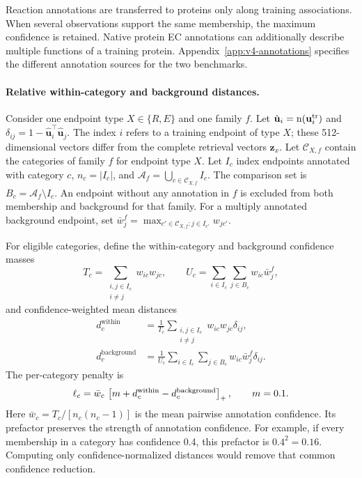 Reaction annotations are transferred to proteins only along training
associations. When several observations support the same membership, the
maximum confidence is retained. Native protein EC annotations can additionally
describe multiple functions of a training protein. Appendix~\ref{app:v4-annotations}
specifies the different annotation sources for the two benchmarks.

\paragraph{Relative within-category and background distances.}
Consider one endpoint type $X\in\{R,E\}$ and one family $f$. Let
$\hat{\mathbf{u}}_i=\operatorname{n}(\mathbf{u}_i^{\mathrm{tr}})$ and
$\delta_{ij}=1-\hat{\mathbf{u}}_i^\top\hat{\mathbf{u}}_j$.
The index $i$ refers to a training endpoint of type $X$; these 512-dimensional
vectors differ from the complete retrieval vectors $\mathbf{z}_x$.
Let $\mathcal C_{X,f}$ contain the categories of family $f$ for endpoint type
$X$. Let $I_c$ index endpoints annotated with category $c$, $n_c=|I_c|$, and
$\mathcal A_f=\bigcup_{c\in\mathcal C_{X,f}}I_c$. The comparison set is
$B_c=\mathcal A_f\setminus I_c$. An endpoint without any annotation in $f$
is excluded from both membership and background for that family. For a
multiply annotated background endpoint, set
$\bar w_j^f=\max_{c'\in\mathcal C_{X,f}:j\in I_{c'}}w_{jc'}$.

For eligible categories, define the within-category and background confidence
masses
\begin{equation}
  T_c=\sum_{\substack{i,j\in I_c\\i\ne j}}w_{ic}w_{jc},\qquad
  U_c=\sum_{i\in I_c}\sum_{j\in B_c}w_{ic}\bar w_j^f,
\end{equation}
and confidence-weighted mean distances
\begin{align}
  d_c^{\mathrm{within}}
    &=\frac{1}{T_c}
       \sum_{\substack{i,j\in I_c\\i\ne j}}w_{ic}w_{jc}\delta_{ij},\\
  d_c^{\mathrm{background}}
    &=\frac{1}{U_c}\sum_{i\in I_c}\sum_{j\in B_c}
          w_{ic}\bar w_j^f\delta_{ij}.
  \label{eq:v4-bio-distances}
\end{align}
The per-category penalty is
\begin{equation}
  \ell_c=\bar w_c\,
       \left[m+d_c^{\mathrm{within}}-d_c^{\mathrm{background}}\right]_{+},
       \qquad m=0.1.
  \label{eq:v4-relative-bio}
\end{equation}
Here $\bar w_c=T_c/[n_c(n_c-1)]$ is the mean pairwise annotation confidence.
Its prefactor preserves the strength of annotation confidence. For example,
if every membership in a category has confidence 0.4, this prefactor is
$0.4^2=0.16$. Computing only confidence-normalized distances would remove
that common confidence reduction.

